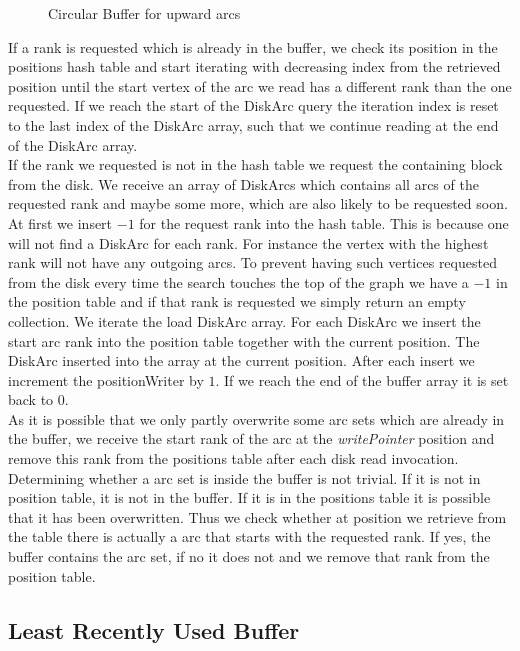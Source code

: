 \begin{figure}[H]
    \centering
    
    \caption{Circular Buffer for upward arcs}
    \label{fig:circular}
\end{figure}

If a rank is requested which is already in the buffer, we check its position in the positions hash table and start iterating with decreasing index from the retrieved position until the start vertex of the arc we read has a different rank than the one requested.
If we reach the start of the DiskArc query the iteration index is reset to the last index of the DiskArc array, such that we continue reading at the end of the DiskArc array.
\\
If the rank we requested is not in the hash table we request the containing block from the disk.
We receive an array of DiskArcs which contains all arcs of the requested rank and maybe some more, which are also likely to be requested soon.
At first we insert $-1$ for the request rank into the hash table.
This is because one will not find a DiskArc for each rank.
For instance the vertex with the highest rank will not have any outgoing arcs.
To prevent having such vertices requested from the disk every time the search touches the top of the graph we have a $-1$ in the position table and if that rank is requested we simply return an empty collection.
We iterate the load DiskArc array.
For each DiskArc we insert the start arc rank into the position table together with the current position.
The DiskArc inserted into the array at the current position.
After each insert we increment the positionWriter by $1$.
If we reach the end of the buffer array it is set back to $0$.
\\
As it is possible that we only partly overwrite some arc sets which are already in the buffer, we receive the start rank of the arc at the \textit{writePointer} position and remove this rank from the positions table after each disk read invocation.
\\ 
Determining whether a arc set is inside the buffer is not trivial.
If it is not in position table, it is not in the buffer.
If it is in the positions table it is possible that it has been overwritten.
Thus we check whether at position we retrieve from the table there is actually a arc that starts with the requested rank.
If yes, the buffer contains the arc set, if no it does not  and we remove that rank from the position table.

\subsection{Least Recently Used Buffer}

